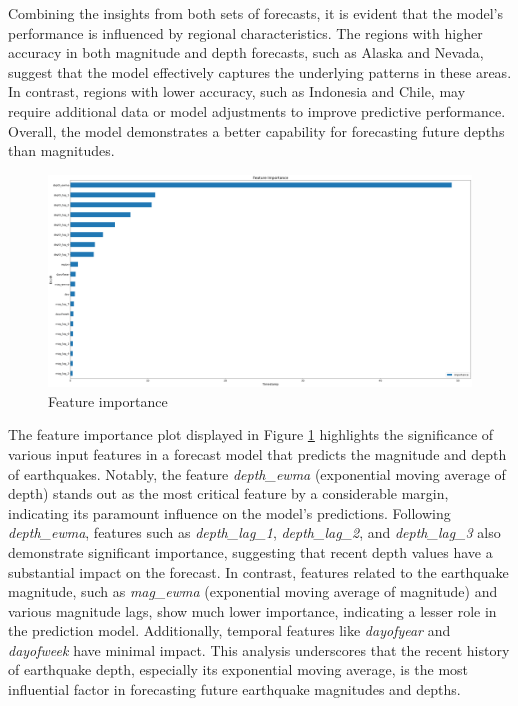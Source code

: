 Combining the insights from both sets of forecasts, it is evident
that the model's performance is influenced by regional characteristics.
The regions with higher accuracy in both magnitude and depth forecasts,
such as Alaska and Nevada, suggest that the model effectively captures
the underlying patterns in these areas. In contrast, regions with lower
accuracy, such as Indonesia and Chile, may require additional data or
model adjustments to improve predictive performance. Overall, the
model demonstrates a better capability for forecasting future depths than magnitudes.

\begin{figure}[hbtp]
  \centering
  \includegraphics[scale=0.18]{img/model-feature-importance.png}
  \captionsetup{format=hang}
  \caption{\label{fig:feature-importance}Feature importance}
\end{figure}

The feature importance plot displayed in Figure \ref{fig:feature-importance}
highlights the significance of various input features in a forecast model that
predicts the magnitude and depth of earthquakes. Notably, the feature
\textit{depth\_ewma} (exponential moving average of depth) stands out as
the most critical feature by a considerable margin, indicating its paramount
influence on the model's predictions. Following \textit{depth\_ewma},
features such as \textit{depth\_lag\_1}, \textit{depth\_lag\_2}, and
\textit{depth\_lag\_3} also demonstrate significant importance, suggesting
that recent depth values have a substantial impact on the forecast. In
contrast, features related to the earthquake magnitude, such as
\textit{mag\_ewma} (exponential moving average of magnitude) and various
magnitude lags, show much lower importance, indicating a lesser role in
the prediction model. Additionally, temporal features like \textit{dayofyear}
and \textit{dayofweek} have minimal impact. This analysis underscores that
the recent history of earthquake depth, especially its exponential moving
average, is the most influential factor in forecasting future earthquake
magnitudes and depths.

